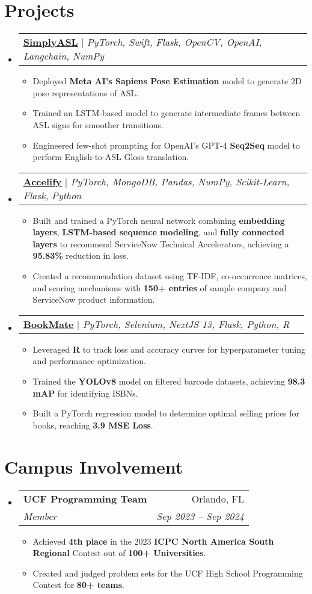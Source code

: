 \documentclass[letterpaper,11pt]{article}
\makeatletter
\newcommand{\resumeItem}[1]{
  \item\small{
    {#1 \vspace{-2pt}}
  }
}
\newcommand{\resumeSubheading}[4]{
  \vspace{-2pt}\item
    \begin{tabular*}{0.97\textwidth}[t]{l@{\extracolsep{\fill}}r}
      \textbf{#1} & #2 \\
      \textit{\small#3} & \textit{\small #4} \\
    \end{tabular*}\vspace{-7pt}
}
\newcommand{\resumeProjectHeading}[2]{
    \item
    \begin{tabular*}{0.97\textwidth}{l@{\extracolsep{\fill}}r}
      \small#1 & #2 \\
    \end{tabular*}\vspace{-7pt}
}
\newcommand{\resumeSubHeadingListStart}{\begin{itemize}[leftmargin=0.15in, label={}]}
\newcommand{\resumeSubHeadingListEnd}{\end{itemize}}
\newcommand{\resumeItemListStart}{\begin{itemize}}
\newcommand{\resumeItemListEnd}{\end{itemize}\vspace{-5pt}}
\makeatother
\begin{document}
\section{Projects}
  \resumeSubHeadingListStart
    \resumeProjectHeading
      {\faGithub\hspace{0.25pt} \href{https://github.com/DRobinson4105/Simply-ASL}{\textbf{\uline{SimplyASL}}} $|$ \emph{PyTorch, Swift, Flask, OpenCV, OpenAI, Langchain, NumPy}}{}
      \resumeItemListStart
        \resumeItem{Deployed \textbf{Meta AI’s Sapiens Pose Estimation} model to generate 2D pose representations of ASL.}
        \resumeItem{Trained an LSTM-based model to generate intermediate frames between ASL signs for smoother transitions.}
        \resumeItem{Engineered few-shot prompting for OpenAI's GPT-4 \textbf{Seq2Seq} model to perform English-to-ASL Gloss translation.}
      \resumeItemListEnd
    \resumeProjectHeading
      {\faGithub\hspace{0.25pt} \href{https://github.com/DRobinson4105/accelify}{\textbf{\uline{Accelify}}} $|$ \emph{PyTorch, MongoDB, Pandas, NumPy, Scikit-Learn, Flask, Python}}{}
      \resumeItemListStart
        \resumeItem{Built and trained a PyTorch neural network combining \textbf{embedding layers}, \textbf{LSTM-based sequence modeling}, and \textbf{fully connected layers} to recommend ServiceNow Technical Accelerators, achieving a \textbf{95.83\%} reduction in loss.}
        \resumeItem{Created a recommendation dataset using TF-IDF, co-occurrence matrices, and scoring mechanisms with \textbf{150+ entries} of sample company and ServiceNow product information.}
      \resumeItemListEnd
    \resumeProjectHeading
      {\faGithub\hspace{0.25pt} \href{https://github.com/DRobinson4105/bookmate}{\textbf{\uline{BookMate}}} $|$ \emph{PyTorch, Selenium, NextJS 13, Flask, Python, R}}{}
      \resumeItemListStart
        \resumeItem{Leveraged \textbf{R} to track loss and accuracy curves for hyperparameter tuning and performance optimization.}
        \resumeItem{Trained the \textbf{YOLOv8} model on filtered barcode datasets, achieving \textbf{98.3 mAP} for identifying ISBNs.}
        \resumeItem{Built a PyTorch regression model to determine optimal selling prices for books, reaching \textbf{3.9 MSE Loss}.}
      \resumeItemListEnd
  \resumeSubHeadingListEnd
\section{Campus Involvement}
  \resumeSubHeadingListStart
    \resumeSubheading
      {UCF Programming Team}{Orlando, FL}
      {Member}{Sep 2023 -- Sep 2024}
      \resumeItemListStart
        \resumeItem{Achieved \textbf{4th place} in the 2023 \textbf{ICPC North America South Regional} Contest out of \textbf{100+ Universities}.}
        \resumeItem{Created and judged problem sets for the UCF High School Programming Contest for \textbf{80+ teams}.}
      \resumeItemListEnd
  \resumeSubHeadingListEnd
\end{document}
